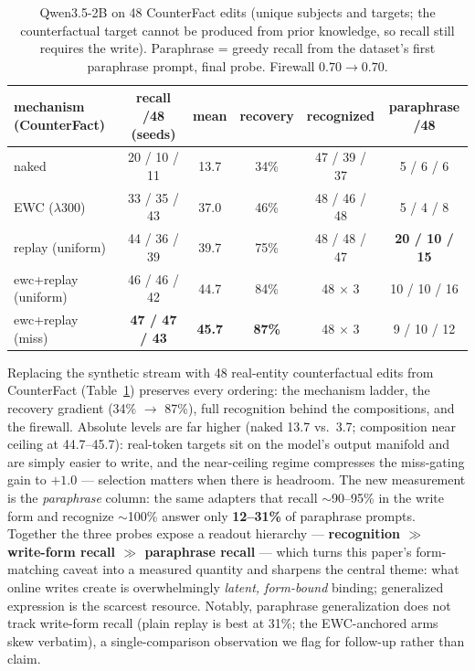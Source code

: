 \documentclass[11pt]{article}
\newcommand{\qwen}{Qwen3.5-2B}
\begin{document}
\begin{table}[t]
\centering\small
\begin{tabular}{lccccc}
\toprule
mechanism (CounterFact) & recall /48 (seeds) & mean & recovery & recognized & paraphrase /48 \\
\midrule
naked            & 20 / 10 / 11 & 13.7 & 34\% & 47 / 39 / 37 & 5 / 6 / 6 \\
EWC ($\lambda$300) & 33 / 35 / 43 & 37.0 & 46\% & 48 / 46 / 48 & 5 / 4 / 8 \\
replay (uniform) & 44 / 36 / 39 & 39.7 & 75\% & 48 / 48 / 47 & \textbf{20 / 10 / 15} \\
ewc+replay (uniform) & 46 / 46 / 42 & 44.7 & 84\% & 48 $\times$ 3 & 10 / 10 / 16 \\
ewc+replay (miss) & \textbf{47 / 47 / 43} & \textbf{45.7} & \textbf{87\%} & 48 $\times$ 3 & 9 / 10 / 12 \\
\bottomrule
\end{tabular}
\caption{\qwen{} on 48 CounterFact edits (unique subjects and targets; the counterfactual target
cannot be produced from prior knowledge, so recall still requires the write). Paraphrase = greedy
recall from the dataset's first paraphrase prompt, final probe. Firewall $0.70 \to 0.70$.}
\label{tab:cf}
\end{table}

Replacing the synthetic stream with 48 real-entity counterfactual edits from CounterFact
\citep{meng2022rome} (Table~\ref{tab:cf}) preserves every ordering: the mechanism ladder, the
recovery gradient (34\% $\to$ 87\%), full recognition behind the compositions, and the firewall.
Absolute levels are far higher (naked 13.7 vs.\ 3.7; composition near ceiling at 44.7--45.7):
real-token targets sit on the model's output manifold and are simply easier to write, and the
near-ceiling regime compresses the miss-gating gain to $+1.0$ --- selection matters when there is
headroom. The new measurement is the \emph{paraphrase} column: the same adapters that recall
$\sim$90--95\% in the write form and recognize $\sim$100\% answer only \textbf{12--31\%} of
paraphrase prompts. Together the three probes expose a readout hierarchy --- \textbf{recognition
$\gg$ write-form recall $\gg$ paraphrase recall} --- which turns this paper's form-matching caveat
into a measured quantity and sharpens the central theme: what online writes create is overwhelmingly
\emph{latent, form-bound} binding; generalized expression is the scarcest resource. Notably,
paraphrase generalization does not track write-form recall (plain replay is best at 31\%; the
EWC-anchored arms skew verbatim), a single-comparison observation we flag for follow-up rather than
claim.
\end{document}
